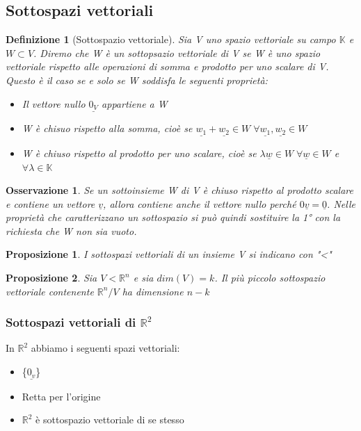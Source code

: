 \documentclass[12pt]{article}
\newenvironment{para}{\begin{adjustwidth}{13mm}{}}{\end{adjustwidth}}
\newtheorem{Definizione}{Definizione}[subsection]
\newtheorem{Proposizione}{Proposizione}[subsection]
\newtheorem{Osservazione}{Osservazione}[subsection]
\begin{document}
\begin{para}
\subsection{Sottospazi vettoriali}
\begin{Definizione}[Sottospazio vettoriale]
Sia V uno spazio vettoriale su campo $\mathbb{K}$ e $W \subset V$. Diremo che W è un sottopsazio vettoriale di V se W è uno spazio vettoriale rispetto alle operazioni di somma e prodotto per uno scalare di V. Questo è il caso se e solo se W soddisfa le seguenti proprietà:
\begin{itemize}
    \item  Il vettore nullo $\underline{0_V}$ appartiene a W
    \item W è chisuo rispetto alla somma, cioè se $\underline{w_1}+\underline{w_2}\in W \; \forall\underline{w_1},\underline{w_2}\in W$
    \item W è chiuso rispetto al prodotto per uno scalare, cioè se $\lambda \underline{w}\in W \; \forall\underline{w}\in W$ e $\forall \lambda \in \mathbb{K}$
\end{itemize}
\end{Definizione}

\begin{Osservazione}
Se un sottoinsieme W di V è chiuso rispetto al prodotto scalare e contiene un vettore $\underline{v}$, allora contiene anche il vettore nullo perché $0\underline{v}=\underline{0}$. Nelle proprietà che caratterizzano un sottospazio si può quindi sostituire la 1° con la richiesta che W non sia vuoto.
\end{Osservazione}

\begin{Proposizione}
I sottospazi vettoriali di un insieme V si indicano con "<"
\end{Proposizione}
\begin{Proposizione}
    Sia $V < \mathbb{R}^n$ e sia $dim(V) = k$. Il più piccolo sottospazio vettoriale contenente $\mathbb{R}^n/V$ ha dimensione $n-k$
\end{Proposizione}
\subsubsection{Sottospazi vettoriali di $\mathbb{R}^2$}
In $\mathbb{R}^2$ abbiamo i seguenti spazi vettoriali:
\begin{itemize}
    \item \{$\underline{0_v}$\}
    \item Retta per l'origine
    \item $\mathbb{R}^2$ è sottospazio vettoriale di se stesso
\end{itemize}


\end{para}
\end{document}
